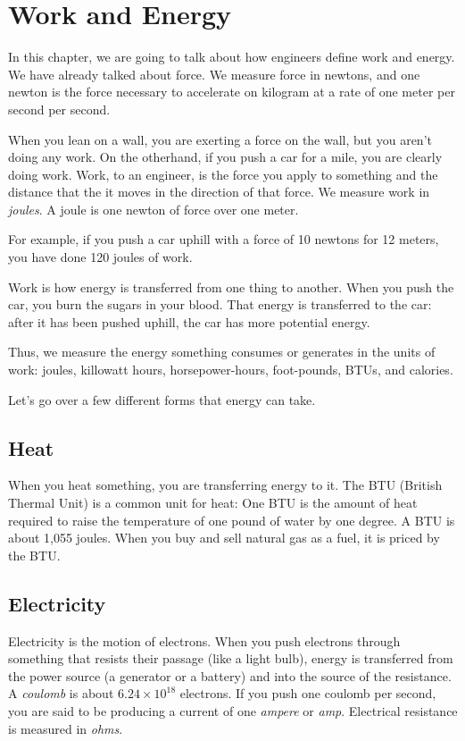 \chapter{Work and Energy}

In this chapter, we are going to talk about how engineers define work
and energy.  We have already talked about force.  We measure force in
newtons, and one newton is the force necessary to accelerate on
kilogram at a rate of one meter per second per second.

When you lean on a wall, you are exerting a force on the wall, but you
aren't doing any work. On the otherhand, if you push a car for a mile,
you are clearly doing work. Work, to an engineer, is the force you
apply to something and the distance that the it moves in the direction
of that force. We measure work in \textit{joules}. A joule is one
newton of force over one meter.

For example, if you push a car uphill with a force of 10 newtons for 12
meters, you have done 120 joules of work.

Work is how energy is transferred from one thing to another. When you
push the car, you burn the sugars in your blood. That energy is
transferred to the car: after it has been pushed uphill, the car has
more potential energy.

Thus, we measure the energy something consumes or generates in the
units of work: joules, killowatt hours, horsepower-hours, foot-pounds,
BTUs, and calories.

Let's go over a few different forms that energy can take.

\section{Heat}

When you heat something, you are transferring energy to it.  The BTU
(British Thermal Unit) is a common unit for heat: One BTU is the
amount of heat required to raise the temperature of one pound of water
by one degree. A BTU is about 1,055 joules. When you buy and sell
natural gas as a fuel, it is priced by the BTU. 

\section{Electricity}

Electricity is the motion of electrons. When you push electrons
through something that resists their passage (like a light bulb),
energy is transferred from the power source (a generator or a battery)
and into the source of the resistance. A \textit{coulomb} is about
$6.24 \times 10^18$ electrons.  If you push one coulomb per second,
you are said to be producing a current of one \textit{ampere} or
\textit{amp}. Electrical resistance is measured in \textit{ohms}.

